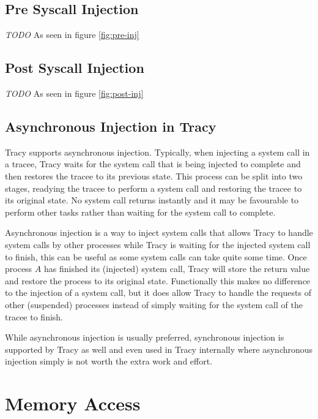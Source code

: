 \documentclass[a4paper, 10pt]{report}
\begin{document}
\subsection{Pre Syscall Injection}

\textit{TODO}
As seen in figure \ref{fig:pre-inj}

\subsection{Post Syscall Injection}

\textit{TODO}
As seen in figure \ref{fig:post-inj}

\subsection{Asynchronous Injection in Tracy}

Tracy supports asynchronous injection. Typically, when injecting a system call
in a tracee, Tracy waits for the system call that is being injected to complete
and then restores the tracee to its previous state. This process can be split
into two stages, readying the tracee to perform a system call and restoring
the tracee to its original state. No system call returns instantly and it
may be favourable to perform other tasks rather than waiting for the system
call to complete.

Asynchronous injection is a way to inject system calls that allows Tracy to
handle system calls by other processes while Tracy is waiting for the
injected system call to finish, this can be useful as some system calls can take quite
some time.
Once process $A$ has finished its (injected) system call, Tracy will store
the return value and restore the process to its original state.
Functionally this makes no difference to the injection of a system call, but
it does allow Tracy to handle the requests of other (suspended) processes
instead of simply waiting for the system call of the tracee to finish.

While asynchronous injection is usually preferred, synchronous injection is
supported by Tracy as well and even used in Tracy internally where
asynchronous injection simply is not worth the extra work and effort.

\section{Memory Access}

\end{document}
